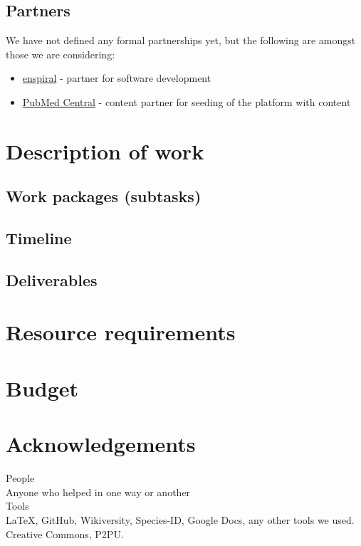 \documentclass[final,authoryear,3p]{elsarticle-open-drafting}
\begin{document}
\subsection{Partners}
We have not defined any formal partnerships yet, but the following are amongst those we are considering:
\begin{itemize}
	\item \href{http://www.enspiral.com}{enspiral} - partner for software development
	\item \href{http://www.ncbi.nlm.nih.gov/pmc/}{PubMed Central} - content partner for seeding of the platform with content
	
\end{itemize}

\section{Description of work}
\subsection{Work packages (subtasks)}
\subsection{Timeline}
\subsection{Deliverables}

\section{Resource requirements}
\section{Budget}
\section{Acknowledgements}
People\\
Anyone who helped in one way or another\\

Tools\\
\LaTeX, GitHub, Wikiversity, Species-ID, Google Docs, any other tools we used.
Creative Commons, P2PU.
\end{document}
